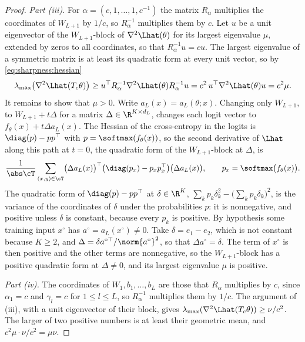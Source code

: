 \begin{refsection}
\begin{proof}
\emph{Part (iii).} For $\alpha=(c,1,\dots,1,c^{-1})$ the matrix $R_\alpha$ multiplies the coordinates of $W_{L+1}$ by $1/c$, so $R_\alpha^{-1}$ multiplies them by $c$. Let $u$ be a unit eigenvector of the $W_{L+1}$-block of $\nabla^2\Lhat(\theta)$ for its largest eigenvalue $\mu$, extended by zeros to all coordinates, so that $R_\alpha^{-1}u=cu$. The largest eigenvalue of a symmetric matrix is at least its quadratic form at every unit vector, so by \eqref{eq:sharpness:hessian}
\[
\lambda_{\max}\bigl(\nabla^2\Lhat(T_c\theta)\bigr)\ge u^\top R_\alpha^{-1}\nabla^2\Lhat(\theta)R_\alpha^{-1}u=c^2\,u^\top\nabla^2\Lhat(\theta)u=c^2\mu .
\]
It remains to show that $\mu>0$. Write $a_L(x)=a_L(\theta;x)$. Changing only $W_{L+1}$, to $W_{L+1}+t\Delta$ for a matrix $\Delta\in\R^{K\times d_L}$, changes each logit vector to $f_\theta(x)+t\Delta a_L(x)$. The Hessian of the cross-entropy in the logits is $\diag(p)-pp^\top$ with $p=\softmax(f_\theta(x))$, so the second derivative of $\Lhat$ along this path at $t=0$, the quadratic form of the $W_{L+1}$-block at $\Delta$, is
\[
\frac1{\abs\cT}\sum_{(x,y)\in\cT}\bigl(\Delta a_L(x)\bigr)^\top\bigl(\diag(p_x)-p_xp_x^\top\bigr)\bigl(\Delta a_L(x)\bigr),\qquad p_x=\softmax\bigl(f_\theta(x)\bigr).
\]
The quadratic form of $\diag(p)-pp^\top$ at $\delta\in\R^K$, $\sum_kp_k\delta_k^2-\bigl(\sum_kp_k\delta_k\bigr)^2$, is the variance of the coordinates of $\delta$ under the probabilities $p$: it is nonnegative, and positive unless $\delta$ is constant, because every $p_k$ is positive. By hypothesis some training input $x^\circ$ has $a^\circ=a_L(x^\circ)\ne0$. Take $\delta=e_1-e_2$, which is not constant because $K\ge2$, and $\Delta=\delta a^{\circ\top}/\norm{a^\circ}^2$, so that $\Delta a^\circ=\delta$. The term of $x^\circ$ is then positive and the other terms are nonnegative, so the $W_{L+1}$-block has a positive quadratic form at $\Delta\ne0$, and its largest eigenvalue $\mu$ is positive.

\emph{Part (iv).} The coordinates of $W_1,b_1,\dots,b_L$ are those that $R_\alpha$ multiplies by $c$, since $\alpha_1=c$ and $\gamma_l=c$ for $1\le l\le L$, so $R_\alpha^{-1}$ multiplies them by $1/c$. The argument of (iii), with a unit eigenvector of their block, gives $\lambda_{\max}(\nabla^2\Lhat(T_c\theta))\ge\nu/c^2$. The larger of two positive numbers is at least their geometric mean, and $c^2\mu\cdot\nu/c^2=\mu\nu$.
\end{proof}


\end{refsection}
